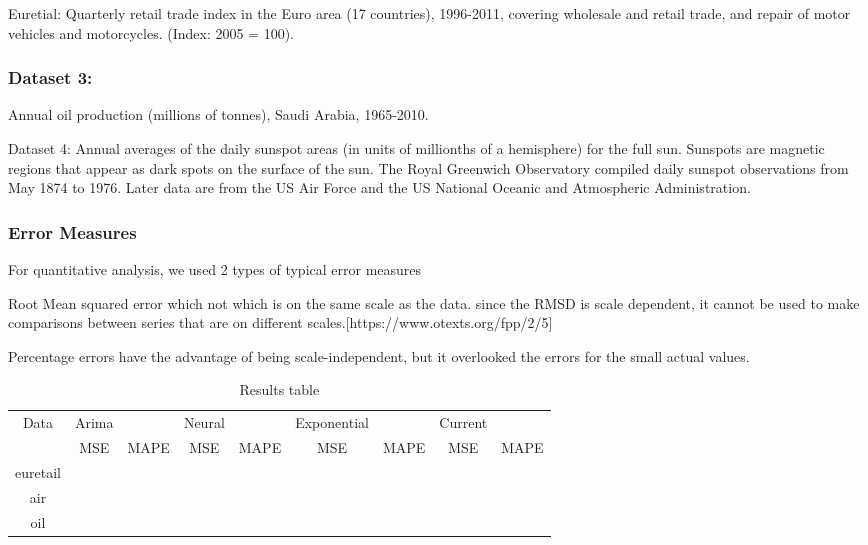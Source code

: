 Euretial: Quarterly retail trade index in the Euro area (17 countries), 1996-2011, covering wholesale and retail trade, and repair of motor vehicles and motorcycles. (Index: 2005 = 100).


\subsubsection{Dataset 3:}

Annual oil production (millions of tonnes), Saudi Arabia, 1965-2010.




Dataset 4: Annual averages of the daily sunspot areas (in units of millionths of a hemisphere) for the full sun. Sunspots are magnetic regions that appear as dark spots on the surface of the sun. The Royal Greenwich Observatory compiled daily sunspot observations from May 1874 to 1976. Later data are from the US Air Force and the US National Oceanic and Atmospheric Administration.



\subsubsection{Error Measures}



For quantitative analysis, we used 2 types of  typical error measures 

Root Mean squared error which  not which is on the same scale as the data. since the RMSD is scale dependent, it cannot be used to make comparisons between series that are on different scales.[https://www.otexts.org/fpp/2/5]



Percentage errors have the advantage of being scale-independent, but it overlooked the errors for the small actual values.




\begin{table} 
    \begin{tabular}{ c c c c c c c c c }
        Data & Arima &  & Neural &  & Exponential &  & Current &  \\ 
         & MSE & MAPE & MSE & MAPE & MSE & MAPE & MSE & MAPE \\ 
        euretail &  &  &  &  &  &  &  &  \\ 
        air &  &  &  &  &  &  &  &  \\ 
        oil &  &  &  &  &  &  &  &  \\ 
    \end{tabular} 
    \caption{Results table} 
\end{table}

